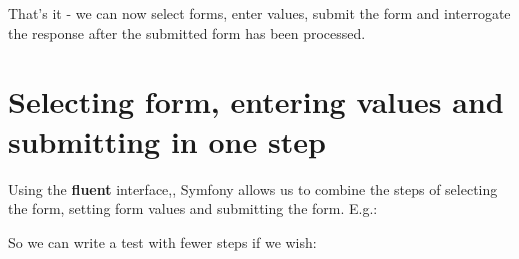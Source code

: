 \documentclass[a4paperpaper,openright]{book}
\newenvironment{Shaded}{}{}
\newcommand{\KeywordTok}[1]{\textcolor[rgb]{0.00,0.44,0.13}{\textbf{#1}}}
\newcommand{\NormalTok}[1]{#1}
\newcommand{\OtherTok}[1]{\textcolor[rgb]{0.00,0.44,0.13}{#1}}
\newcommand{\StringTok}[1]{\textcolor[rgb]{0.25,0.44,0.63}{#1}}
\begin{document}
That's it - we can now select forms, enter values, submit the form and
interrogate the response after the submitted form has been processed.

\hypertarget{selecting-form-entering-values-and-submitting-in-one-step}{%
\section{Selecting form, entering values and submitting in one
step}\label{selecting-form-entering-values-and-submitting-in-one-step}}

Using the \textbf{fluent} interface,, Symfony allows us to combine the
steps of selecting the form, setting form values and submitting the
form. E.g.:

\begin{Shaded}
\end{Shaded}

So we can write a test with fewer steps if we wish:
\end{document}
